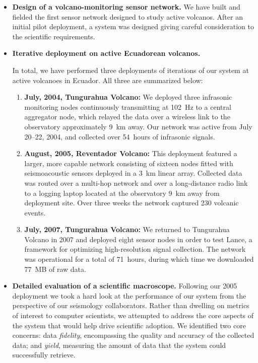 \begin{itemize}

\item \textbf{Design of a volcano-monitoring sensor network.}
We have built and fielded the first sensor network designed to study active
volcanos. After an initial pilot deployment, a system was designed giving
careful consideration to the scientific requirements.

\item \textbf{Iterative deployment on active Ecuadorean volcanos.}

In total, we have performed three deployments of iterations of our system at
active volcanoes in Ecuador. All three are summarized below:

\begin{enumerate}

\item \textbf{July, 2004, Tungurahua Volcano:} We deployed three infrasonic
monitoring nodes continuously transmitting at 102~Hz to a central aggregator
node, which relayed the data over a wireless link to the observatory
approximately 9~km away.  Our network was active from July 20--22, 2004, and
collected over 54~hours of infrasonic signals.

\item \textbf{August, 2005, Reventador Volcano:} This deployment featured a larger,
more capable network consisting of sixteen nodes fitted with seismoacoustic
sensors deployed in a 3~km linear array.  Collected data was routed over a
multi-hop network and over a long-distance radio link to a logging laptop
located at the observatory 9~km away from deployment site.  Over three weeks
the network captured 230 volcanic events.

\item \textbf{July, 2007, Tungurahua Volcano:} We returned to Tungurahua Volcano in
2007 and deployed eight sensor nodes in order to test Lance, a framework for
optimizing high-resolution signal collection. The network was operational for
a total of 71~hours, during which time we downloaded 77~MB of raw data.

\end{enumerate}

\item \textbf{Detailed evaluation of a scientific macroscope.} Following our
2005 deployment we took a hard look at the performance of our system from the
perspective of our seismology collaborators. Rather than dwelling on metrics
of interest to computer scientists, we attempted to address the core aspects
of the system that would help drive scientific adoption. We identified two
core concerns: data \textit{fidelity}, encompassing the quality and accuracy
of the collected data; and \textit{yield}, measuring the amount of data that
the system could successfully retrieve.


\end{itemize}
